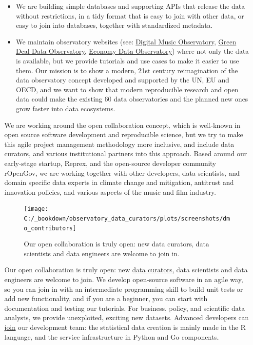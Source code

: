 \documentclass[
  a4paper,
  openany, a4paper, oneside]{book}
\begin{document}
\begin{itemize}
\item
  We are building simple databases and supporting APIs that release the data without restrictions, in a tidy format that is easy to join with other data, or easy to join into databases, together with standardized metadata.
\item
  We maintain observatory websites (see: \href{https://music.dataobservatory.eu/}{Digital Music Observatory}, \href{https://greendeal.dataobservatory.eu/}{Green Deal Data Observatory}, \href{https://economy.dataobservatory.eu/}{Economy Data Observatory}) where not only the data is available, but we provide tutorials and use cases to make it easier to use them. Our mission is to show a modern, 21st century reimagination of the data observatory concept developed and supported by the UN, EU and OECD, and we want to show that modern reproducible research and open data could make the existing 60 data observatories and the planned new ones grow faster into data ecosystems.
\end{itemize}

We are working around the open collaboration concept, which is well-known in open source software development and reproducible science, but we try to make this agile project management methodology more inclusive, and include data curators, and various institutional partners into this approach. Based around our early-stage startup, Reprex, and the open-source developer community rOpenGov, we are working together with other developers, data scientists, and domain specific data experts in climate change and mitigation, antitrust and innovation policies, and various aspects of the music and film industry.

\begin{figure}

{\centering \texttt{[image: C:/\_bookdown/observatory\_data\_curators/plots/screenshots/dmo\_contributors]} 

}

\caption{Our open collaboration is truly open: new data curators, data scientists and data engineers are welcome to join in.}\label{fig:unnamed-chunk-2}
\end{figure}

Our open collaboration is truly open: new \href{https://music.dataobservatory.eu/author/new-curators/}{data curators}, data scientists and data engineers are welcome to join. We develop open-source software in an agile way, so you can join in with an intermediate programming skill to build unit tests or add new functionality, and if you are a beginner, you can start with documentation and testing our tutorials. For business, policy, and scientific data analysts, we provide unexploited, exciting new datasets. Advanced developers can \href{https://greendeal.dataobservatory.eu/author/new-developers/}{join} our development team: the statistical data creation is mainly made in the R language, and the service infrastructure in Python and Go components.
\end{document}
